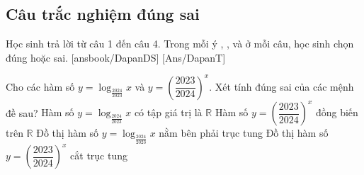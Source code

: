 \subsection{Câu trắc nghiệm đúng sai}
Học sinh trả lời từ câu 1 đến câu 4.
Trong mỗi ý , ,  và  ở mỗi câu, học sinh chọn đúng hoặc sai.
\setcounter{ex}{0}
\LGexTF
{}[ansbook/DapanDS]
[Ans/DapanT]
\begin{ex}%
	Cho các hàm số $y=\log _{\frac{2024}{2023}} x$ và $y=\left(\dfrac{2023}{2024}\right)^x$. Xét tính đúng sai của các mệnh đề sau?
	\choiceTF
	{\True Hàm số $y=\log _{\frac{2024}{2023}} x$ có tập giá trị là $\mathbb{R}$}
	{ Hàm số $y=\left(\dfrac{2023}{2024}\right)^x$ đồng biến trên $\mathbb{R}$}
	{\True Đồ thị hàm số $y=\log _{\frac{2024}{2023}} x$ nằm bên phải trục tung}
	{\True Đồ thị hàm số $y=\left(\dfrac{2023}{2024}\right)^x$ cắt trục tung}
\end{ex}
